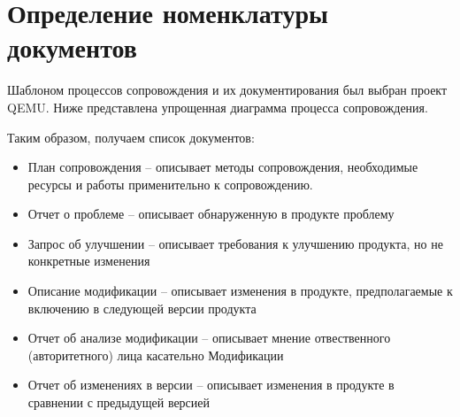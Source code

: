 
\pagebreak


\section{Определение номенклатуры документов}

Шаблоном процессов сопровождения и их документирования был выбран проект QEMU\cite{qemu,qemucontribute}.
Ниже представлена упрощенная диаграмма процесса сопровождения.

\begin{figure}[ht]
    \begin{center}
    \end {center}\label{fig:maintenance_process}
\end {figure}

Таким образом, получаем список документов:

\begin{itemize}
    \item План сопровождения -- описывает методы сопровождения, необходимые ресурсы и работы применительно к сопровождению.

    \item Отчет о проблеме -- описывает обнаруженную в продукте проблему

    \item Запрос об улучшении -- описывает требования к улучшению продукта, но не конкретные изменения

    \item Описание модификации -- описывает изменения в продукте, предполагаемые к включению в следующей версии продукта

    \item Отчет об анализе модификации -- описывает мнение отвественного (авторитетного) лица касательно Модификации

    \item Отчет об изменениях в версии -- описывает изменения в продукте в сравнении с предыдущей версией
\end{itemize}
